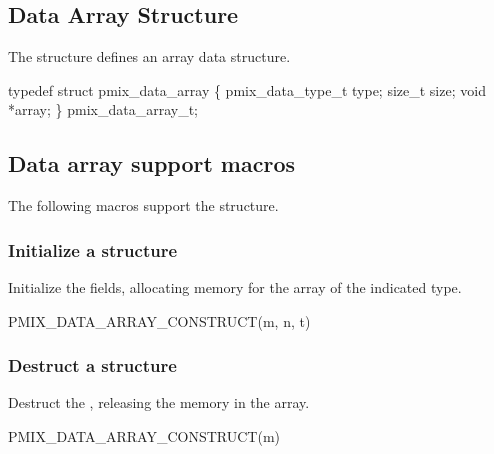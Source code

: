 \subsection{Data Array Structure}

The  structure defines an array data structure.

\cspecificstart
\begin{codepar}
typedef struct pmix_data_array \{
    pmix_data_type_t type;
    size_t size;
    void *array;
\} pmix_data_array_t;
\end{codepar}
\cspecificend


\subsection{Data array support macros}
The following macros support the  structure.

\subsubsection{Initialize a  structure}

Initialize the  fields, allocating memory for the array of the indicated type.

\cspecificstart
\begin{codepar}
PMIX_DATA_ARRAY_CONSTRUCT(m, n, t)
\end{codepar}
\cspecificend

\begin{arglist}
\end{arglist}


\subsubsection{Destruct a  structure}

Destruct the , releasing the memory in the array.

\cspecificstart
\begin{codepar}
PMIX_DATA_ARRAY_CONSTRUCT(m)
\end{codepar}
\cspecificend

